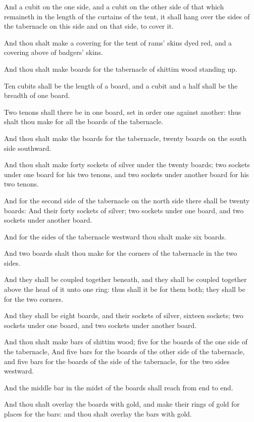 \Verse And a cubit on the one side, and a cubit on the other side of that which remaineth in the length of the curtains of the tent, it shall hang over the sides of the tabernacle on this side and on that side, to cover it.

\Verse And thou shalt make a covering for the tent of rams' skins dyed red, and a covering above of badgers' skins.

\Verse And thou shalt make boards for the tabernacle of shittim wood standing up.

\Verse Ten cubits shall be the length of a board, and a cubit and a half shall be the breadth of one board.

\Verse Two tenons shall there be in one board, set in order one against another: thus shalt thou make for all the boards of the tabernacle.

\Verse And thou shalt make the boards for the tabernacle, twenty boards on the south side southward.

\Verse And thou shalt make forty sockets of silver under the twenty boards; two sockets under one board for his two tenons, and two sockets under another board for his two tenons.

\Verse And for the second side of the tabernacle on the north side there shall be twenty boards: \Verse And their forty sockets of silver; two sockets under one board, and two sockets under another board.

\Verse And for the sides of the tabernacle westward thou shalt make six boards.

\Verse And two boards shalt thou make for the corners of the tabernacle in the two sides.

\Verse And they shall be coupled together beneath, and they shall be coupled together above the head of it unto one ring: thus shall it be for them both; they shall be for the two corners.

\Verse And they shall be eight boards, and their sockets of silver, sixteen sockets; two sockets under one board, and two sockets under another board.

\Verse And thou shalt make bars of shittim wood; five for the boards of the one side of the tabernacle, \Verse And five bars for the boards of the other side of the tabernacle, and five bars for the boards of the side of the tabernacle, for the two sides westward.

\Verse And the middle bar in the midst of the boards shall reach from end to end.

\Verse And thou shalt overlay the boards with gold, and make their rings of gold for places for the bars: and thou shalt overlay the bars with gold.

